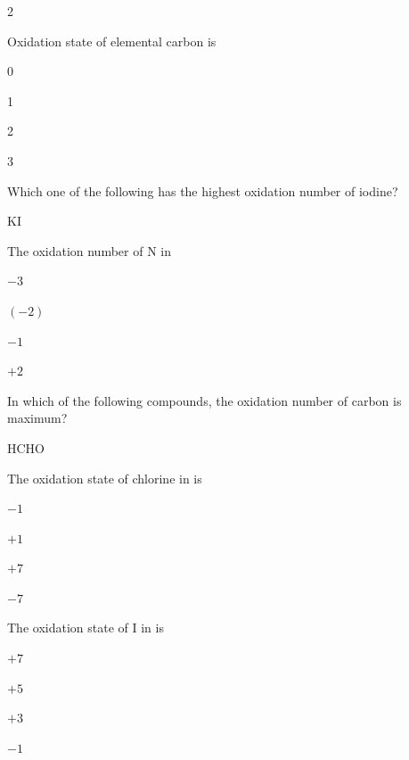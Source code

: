 \documentclass[10pt,a4paper]{article}
\begin{document}
\begin{multicols}{2}
\begin{questions}[start=1]
\item Oxidation state of elemental carbon is
\begin{options}
  \item 0
  \item 1
  \item 2
  \item 3
\end{options}

\item Which one of the following has the highest oxidation number of iodine?
\begin{options}
  \item {}
  \item KI
  \item {}
  \item {}
\end{options}

\item The oxidation number of N in 
\begin{options}
  \item $-3$
  \item $(-2)$
  \item $-1$
  \item $+2$
\end{options}

\item In which of the following compounds, the oxidation number of carbon is maximum?
\begin{options}
  \item HCHO
  \item {}
  \item {}
  \item {}
\end{options}

\item The oxidation state of chlorine in  is
\begin{options}
  \item $-1$
  \item $+1$
  \item $+7$
  \item $-7$
\end{options}

\item The oxidation state of I in  is
\begin{options}
  \item $+7$
  \item $+5$
  \item $+3$
  \item $-1$
\end{options}


\end{questions}
\end{multicols}
\end{document}
